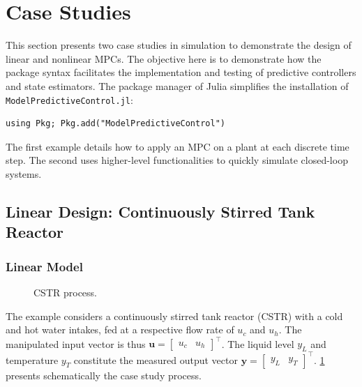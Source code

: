 \section{Case Studies}
\label{sec:case_studies}

This section presents two case studies in simulation to demonstrate the design of linear and nonlinear MPCs. The objective here is to demonstrate how the package syntax facilitates the implementation and testing of predictive controllers and state estimators. The package manager of Julia simplifies the installation of \texttt{ModelPredictiveControl.jl}:
\begin{verbatim}
using Pkg; Pkg.add("ModelPredictiveControl")
\end{verbatim}
The first example details how to apply an MPC on a plant at each discrete time step. The second uses higher-level functionalities to quickly simulate closed-loop systems.

\subsection{Linear Design: Continuously Stirred Tank Reactor}

\subsubsection{Linear Model}

\begin{figure}[b]
    \centering
    
    \caption{CSTR process.}
    \label{fig:cstr}
\end{figure}

The example considers a continuously stirred tank reactor (CSTR) with a cold and hot water intakes, fed at a respective flow rate of $u_c$ and $u_h$. The manipulated input vector is thus $\mathbf{u} = [\begin{smallmatrix}u_c & u_h\end{smallmatrix}]^\intercal$. The liquid level $y_L$ and temperature $y_T$ constitute the measured output vector $\mathbf{y} = [\begin{smallmatrix}y_L & y_T\end{smallmatrix}]^\intercal$. \cref{fig:cstr} presents schematically the case study process.

